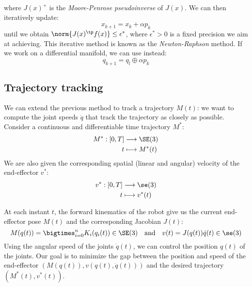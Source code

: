 where $J(x)^+$ is the \emph{Moore-Penrose pseudoinverse} of $J(x)$. We can then iteratively update:
\begin{equation*}
    x_{k+1} = x_k + \alpha p_k
\end{equation*}
until we obtain $\norm{J(x)^\tp f(x)}\leq\epsilon^*$, where $\epsilon^*>0$ is a fixed precision we aim at achieving. This iterative method is known as the \emph{Newton-Raphson} method. If we work on a differential manifold, we can use instead:
\begin{equation*}
    q_{k+1}=q_l\oplus\alpha p_k
\end{equation*}

\subsection{Trajectory tracking}
We can extend the previous method to track a trajectory $M(t)$: we want to compute the joint speeds $\dot{q}$ that track the trajectory as closely as possible. Consider a continuous and differentiable time trajectory $M^*$:
\begin{equation*}
    \begin{aligned}
        M^*:[0, T]&\longrightarrow \SE(3)\\
        t&\longmapsto M^*(t)
    \end{aligned}
\end{equation*}
We are also given the corresponding spatial (linear and angular) velocity of the end-effector $v^*$:
\begin{equation*}
    \begin{aligned}
        v^*:[0, T]&\longrightarrow\se(3)\\
        t&\longmapsto v^*(t)
    \end{aligned}
\end{equation*}

At each instant $t$, the forward kinematics of the robot give us the current end-effector pose $M(t)$ and the corresponding Jacobian $J(t)$:
\begin{equation*}
    M(q(t)) = \bigtimes_{i=0}^n K_i(q_i(t)) \in\SE(3)
    \quad\text{and}\quad
    v(t) = J(q(t))\dot{q}(t)\in\se(3)
\end{equation*}
Using the angular speed of the joints $\dot{q}(t)$, we can control the position $q(t)$ of the joints. Our goal is to minimize the gap between the position and speed of the end-effector $(M(q(t)), v(q(t), \dot{q}(t)))$ and the desired trajectory $(M^*(t), v^*(t))$.

